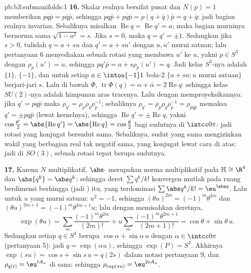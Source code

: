 \begin{solution}{pb:b3:submanifolds:1}
\textbf{16.} Skalar realnya bersifat pusat dan $N(p) = 1$ memberikan
$\overline{pq\bar p} = p\bar q\bar p$, sehingga $pq\bar p +
\overline{pq\bar p} = p(q + \bar q)\bar p = q + \bar q$:
jadi bagian realnya invarian. Sebaliknya misalkan
$\operatorname{Re}q = \operatorname{Re}q' = a$; maka
bagian murninya bernorma sama $\sqrt{1 - a^2} = s$. Jika $s =
0$, maka $q = q' = \pm1$. Sedangkan jika $s > 0$, tulislah $q = a + su$ dan $q' =
a + su'$ dengan $u, u'$ murni satuan; lalu pertanyaan 6 menyediakan sebuah
rotasi yang membawa $u'$ ke $u$, yakni $p \in S^3$ dengan
$\rho_p(u') = u$, sehingga $pq'\bar p = a + s\rho_p(u') =
q$. Jadi kelas $S^3$-nya adalah $\{1\}$, $\{-1\}$,
dan untuk setiap $a \in \intoo{-1}1$ bola-$2$ $\{a + su :
u \text{ murni satuan}\}$ berjari-jari $s$. Lalu di bawah $\Phi$,
$\operatorname{tr}\Phi(q) = \alpha + \bar\alpha =
2\operatorname{Re}q$: sehingga kelas $SU(2)$-nya adalah himpunan
aras tracenya. Lalu dengan memproyeksikannya: jika $q' = pq\bar p$ maka
$\rho_{q'} = \rho_p\rho_q\rho_p^{-1}$; sebaliknya
$\rho_{q'} = \rho_p\rho_q\rho_p^{-1} = \rho_{pq\bar p}$
memaksa $q' = \pm pq\bar p$ (lewat kernelnya), sehingga
$\operatorname{Re}q' = \pm\operatorname{Re}q$, yakni
$\cos\frac{\theta'}2 = \abs{\operatorname{Re}q'} =
\abs{\operatorname{Re}q} = \cos\frac\theta2$ bagi sudutnya
di $\intcc0\pi$: jadi rotasi yang konjugat bersudut sama.
Sebaliknya, sudut yang sama mengizinkan wakil yang berbagian
real tak negatif sama, yang konjugat lewat cara di atas: jadi di
$SO(3)$,  sebuah rotasi tepat berupa
sudutnya.

\textbf{17.} Karena $N$ multiplikatif, $\abs\cdot$ merupakan norma
multiplikatif pada $\mathbb H \cong \R^4$ dan
$\abs{q^k} = \abs q^k$: sehingga deret $\sum q^k/k!$ konvergen
mutlak pada ruang berdimensi berhingga (jadi )
itu, yang terdominasi $\sum\abs q^k/k! = \eu^{\abs q}$. Lalu untuk
$u$ yang murni satuan: $u^2 = -1$, sehingga $(\theta u)^{2m} =
(-1)^m\theta^{2m}$ dan $(\theta u)^{2m+1} =
(-1)^m\theta^{2m+1}u$; lalu dengan memisahkan deretnya,
\[
\exp(\theta u) = \sum_m\frac{(-1)^m\theta^{2m}}{(2m)!} +
u\sum_m\frac{(-1)^m\theta^{2m+1}}{(2m+1)!} = \cos\theta +
\sin\theta\,u .
\]
Sedangkan setiap $q \in S^3$ berupa $\cos\alpha + \sin\alpha\,u$ dengan
$\alpha \in \intcc0\pi$ (pertanyaan 5): jadi $q = \exp(\alpha u)$,
sehingga $\exp(P) = S^3$. Akhirnya $\exp(su) = \cos s + \sin s\,u
= q(2s)$ dalam notasi pertanyaan 9, dan $\rho_{q(t)} =
\eu^{tA_u}$ di sana: sehingga $\rho_{\exp(su)} = \eu^{2sA_u}$.


\end{solution}
